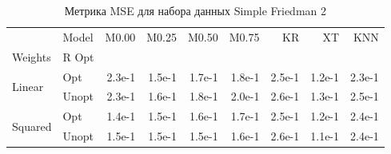 \begin{table}
\caption{Метрика MSE для набора данных Simple Friedman 2}
\label{tab:MSE_Simple Friedman 2}
\begin{tabular}{llrrrrrrr}
\toprule
 & Model & M0.00 & M0.25 & M0.50 & M0.75 & KR & XT & KNN \\
Weights & R Opt &  &  &  &  &  &  &  \\
\midrule
\multirow[t]{2}{*}{Linear} & Opt & 2.3e-1 & 1.5e-1 & 1.7e-1 & 1.8e-1 & 2.5e-1 & 1.2e-1 & 2.3e-1 \\
 & Unopt & 2.3e-1 & 1.6e-1 & 1.8e-1 & 2.0e-1 & 2.6e-1 & 1.3e-1 & 2.5e-1 \\

\multirow[t]{2}{*}{Squared} & Opt & 1.4e-1 & 1.5e-1 & 1.6e-1 & 1.7e-1 & 2.5e-1 & 1.2e-1 & 2.4e-1 \\
 & Unopt & 1.5e-1 & 1.5e-1 & 1.5e-1 & 1.6e-1 & 2.6e-1 & 1.1e-1 & 2.4e-1 \\

\bottomrule
\end{tabular}
\end{table}
